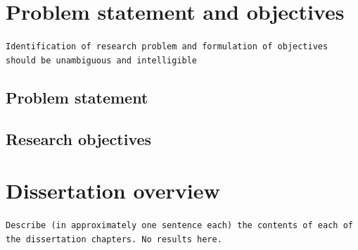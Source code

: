 \section{Problem statement and objectives}
\texttt{Identification of research problem and formulation of objectives should be unambiguous and intelligible}
\subsection{Problem statement}
\subsection{Research objectives}
\section{Dissertation overview}
\texttt{Describe (in approximately one sentence each) the contents of each of the dissertation chapters. No results here.}